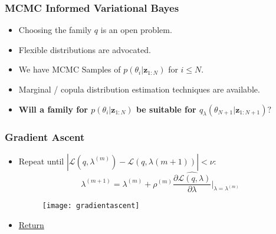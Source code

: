 \documentclass[11pt]{beamer}\usepackage[]{graphicx}\usepackage[]{color}
\begin{document}
\begin{frame}
\frametitle{MCMC Informed Variational Bayes}
\begin{itemize}
\item Choosing the family $q$ is an open problem.
\item Flexible distributions are advocated.
\pause
\vspace{2mm}
\item We have MCMC Samples of $p(\theta_i | \textbf{z}_{1:N})$ for $i \leq N$.
\item Marginal / copula distribution estimation techniques are available.
\pause
\vspace{2mm}
\item \textbf{Will a family for $p(\theta_i | \textbf{z}_{1:N})$ be suitable for $q_{\lambda}(\theta_{N+1} | \textbf{z}_{1:N+1})?$}
\end{itemize}
\end{frame}


\begin{frame}[allowframebreaks]


\end{frame}

\begin{frame}[label=SGA]
\frametitle{Gradient Ascent}
\begin{itemize}
\item Repeat until $| \mathcal{L}(q, \lambda^{(m)}) - \mathcal{L}(q, \lambda{(m+1)})| < \nu$:
\begin{equation*}
\lambda^{(m+1)} = \lambda^{(m)} + \rho^{(m)} \widehat{\frac{\partial\mathcal{L}(q, \lambda)}{\partial \lambda}} \bigg\rvert_{\lambda = \lambda^{(m)}}
\end{equation*}
\begin{figure}
\centering
\texttt{[image: gradientascent]}
\end{figure}
\item \hyperlink{VB}{Return}
\end{itemize}
\end{frame}
\end{document}
